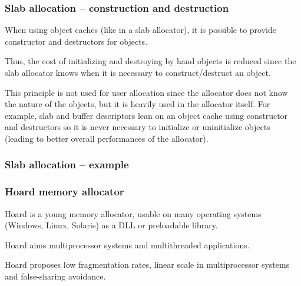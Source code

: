 \begin{frame}
  \frametitle{Slab allocation -- construction and destruction}

  When using object caches (like in a slab allocator), it is possible
  to provide constructor and destructors for objects.

  \-

  Thus, the cost of initializing and destroying by hand objects is
  reduced since the slab allocator knows when it is necessary to
  construct/destruct an object.

  \-

  This principle is not used for user allocation since the allocator
  does not know the nature of the objects, but it is heavily used in
  the allocator itself. For example, slab and buffer descriptors lean
  on an object cache using constructor and destructors so it is never
  necessary to initialize or uninitialize objects (leading to better
  overall performances of the allocator).

\end{frame}


\begin{frame}
  \frametitle{Slab allocation -- example}

  \begin{center}
  \end{center}

\end{frame}


\begin{frame}
  \frametitle{Hoard memory allocator}

  Hoard is a young memory allocator, usable on many operating systems
  (Windows, Linux, Solaris) as a DLL or preloadable library.

  \-

  Hoard aims multiprocessor systems and multithreaded applications.

  \-

  Hoard proposes low fragmentation rates, linear scale in
  multiprocessor systems and false-sharing avoidance.

\end{frame}


